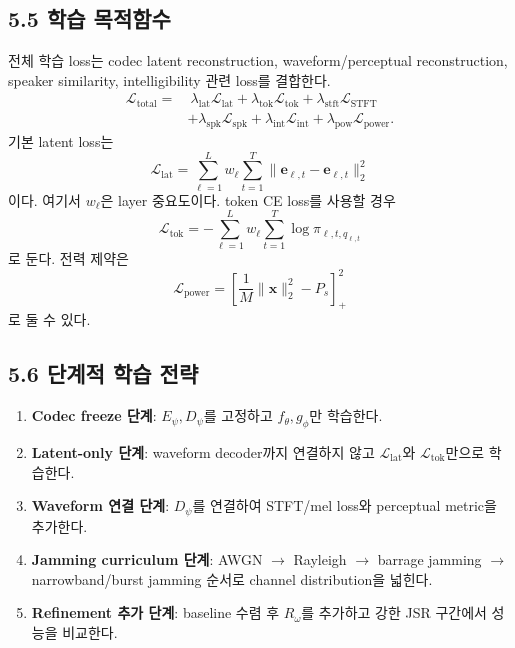 \documentclass[11pt,a4paper]{article}
\begin{document}
\subsection{5.5 학습 목적함수}
전체 학습 loss는 codec latent reconstruction, waveform/perceptual reconstruction, speaker similarity, intelligibility 관련 loss를 결합한다.
\begin{equation}
\begin{aligned}
    \mathcal{L}_{\mathrm{total}}
    =&\ \lambda_{\mathrm{lat}}\mathcal{L}_{\mathrm{lat}}
    +\lambda_{\mathrm{tok}}\mathcal{L}_{\mathrm{tok}}
    +\lambda_{\mathrm{stft}}\mathcal{L}_{\mathrm{STFT}} \\
    &+\lambda_{\mathrm{spk}}\mathcal{L}_{\mathrm{spk}}
    +\lambda_{\mathrm{int}}\mathcal{L}_{\mathrm{int}}
    +\lambda_{\mathrm{pow}}\mathcal{L}_{\mathrm{power}}.
\end{aligned}
\end{equation}
기본 latent loss는
\begin{equation}
    \mathcal{L}_{\mathrm{lat}}=\sum_{\ell=1}^{L}w_{\ell}\sum_{t=1}^{T}\|\bm{e}_{\ell,t}-\hat{\bm{e}}_{\ell,t}\|_2^2
\end{equation}
이다. 여기서 $w_{\ell}$은 layer 중요도이다. token CE loss를 사용할 경우
\begin{equation}
    \mathcal{L}_{\mathrm{tok}}=-\sum_{\ell=1}^{L} w_{\ell}\sum_{t=1}^{T}\log \pi_{\ell,t,q_{\ell,t}}
\end{equation}
로 둔다. 전력 제약은
\begin{equation}
    \mathcal{L}_{\mathrm{power}}=\left[\frac{1}{M}\|\bm{x}\|_2^2-P_s\right]_{+}^{2}
\end{equation}
로 둘 수 있다.

\subsection{5.6 단계적 학습 전략}
\begin{enumerate}[label=\arabic*)]
    \item \textbf{Codec freeze 단계}: $E_{\psi},D_{\psi}$를 고정하고 $f_{\theta},g_{\phi}$만 학습한다.
    \item \textbf{Latent-only 단계}: waveform decoder까지 연결하지 않고 $\mathcal{L}_{\mathrm{lat}}$와 $\mathcal{L}_{\mathrm{tok}}$만으로 학습한다.
    \item \textbf{Waveform 연결 단계}: $D_{\psi}$를 연결하여 STFT/mel loss와 perceptual metric을 추가한다.
    \item \textbf{Jamming curriculum 단계}: AWGN $\rightarrow$ Rayleigh $\rightarrow$ barrage jamming $\rightarrow$ narrowband/burst jamming 순서로 channel distribution을 넓힌다.
    \item \textbf{Refinement 추가 단계}: baseline 수렴 후 $R_{\omega}$를 추가하고 강한 JSR 구간에서 성능을 비교한다.
\end{enumerate}
\end{document}
